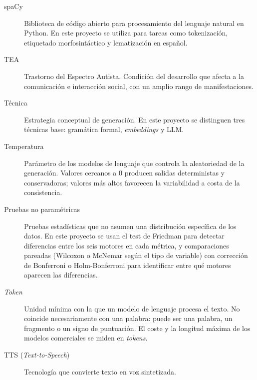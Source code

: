 \begin{description}
    \item[spaCy] Biblioteca de código abierto para procesamiento del lenguaje natural en Python. En este proyecto se utiliza para tareas como tokenización, etiquetado morfosintáctico y lematización en español.

    \item[TEA] Trastorno del Espectro Autista. Condición del desarrollo que afecta a la comunicación e interacción social, con un amplio rango de manifestaciones.

    \item[Técnica] Estrategia conceptual de generación. En este proyecto se distinguen tres técnicas base: gramática formal, \textit{embeddings} y LLM.

    \item[Temperatura] Parámetro de los modelos de lenguaje que controla la aleatoriedad de la generación. Valores cercanos a 0 producen salidas deterministas y conservadoras; valores más altos favorecen la variabilidad a costa de la consistencia.

    \item[Pruebas no paramétricas] Pruebas estadísticas que no asumen una distribución específica de los datos. En este proyecto se usan el test de Friedman para detectar diferencias entre los seis motores en cada métrica, y comparaciones pareadas (Wilcoxon o McNemar según el tipo de variable) con corrección de Bonferroni o Holm-Bonferroni para identificar entre qué motores aparecen las diferencias.

    \item[\textit{Token}] Unidad mínima con la que un modelo de lenguaje procesa el texto. No coincide necesariamente con una palabra: puede ser una palabra, un fragmento o un signo de puntuación. El coste y la longitud máxima de los modelos comerciales se miden en \textit{tokens}.

    \item[TTS (\textit{Text-to-Speech})] Tecnología que convierte texto en voz sintetizada.
\end{description}

